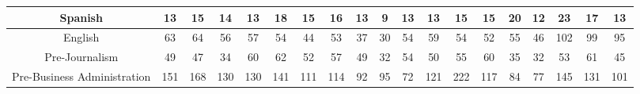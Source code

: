 \documentclass[10]{article}
\begin{document}
\begin{landscape}
\begin{longtable}[c]{|ccccccccccccccccccc|}
	\multicolumn{1}{|c|}{Spanish}                                    & \multicolumn{1}{c|}{13}         & \multicolumn{1}{c|}{15}         & \multicolumn{1}{c|}{14}         & \multicolumn{1}{c|}{13}         & \multicolumn{1}{c|}{18}         & \multicolumn{1}{c|}{15}         & \multicolumn{1}{c|}{16}         & \multicolumn{1}{c|}{13}         & \multicolumn{1}{c|}{9}          & \multicolumn{1}{c|}{13}         & \multicolumn{1}{c|}{13}         & \multicolumn{1}{c|}{15}         & \multicolumn{1}{c|}{15}         & \multicolumn{1}{c|}{20}         & \multicolumn{1}{c|}{12}         & \multicolumn{1}{c|}{23}         & \multicolumn{1}{c|}{17}         & 13         \\ \hline
	\multicolumn{1}{|c|}{English}                                    & \multicolumn{1}{c|}{63}         & \multicolumn{1}{c|}{64}         & \multicolumn{1}{c|}{56}         & \multicolumn{1}{c|}{57}         & \multicolumn{1}{c|}{54}         & \multicolumn{1}{c|}{44}         & \multicolumn{1}{c|}{53}         & \multicolumn{1}{c|}{37}         & \multicolumn{1}{c|}{30}         & \multicolumn{1}{c|}{54}         & \multicolumn{1}{c|}{59}         & \multicolumn{1}{c|}{54}         & \multicolumn{1}{c|}{52}         & \multicolumn{1}{c|}{55}         & \multicolumn{1}{c|}{46}         & \multicolumn{1}{c|}{102}        & \multicolumn{1}{c|}{99}         & 95         \\ \hline
	\multicolumn{1}{|c|}{Pre-Journalism}                             & \multicolumn{1}{c|}{49}         & \multicolumn{1}{c|}{47}         & \multicolumn{1}{c|}{34}         & \multicolumn{1}{c|}{60}         & \multicolumn{1}{c|}{62}         & \multicolumn{1}{c|}{52}         & \multicolumn{1}{c|}{57}         & \multicolumn{1}{c|}{49}         & \multicolumn{1}{c|}{32}         & \multicolumn{1}{c|}{54}         & \multicolumn{1}{c|}{50}         & \multicolumn{1}{c|}{55}         & \multicolumn{1}{c|}{60}         & \multicolumn{1}{c|}{35}         & \multicolumn{1}{c|}{32}         & \multicolumn{1}{c|}{53}         & \multicolumn{1}{c|}{61}         & 45         \\ \hline
	\multicolumn{1}{|c|}{Pre-Business Administration}                & \multicolumn{1}{c|}{151}        & \multicolumn{1}{c|}{168}        & \multicolumn{1}{c|}{130}        & \multicolumn{1}{c|}{130}        & \multicolumn{1}{c|}{141}        & \multicolumn{1}{c|}{111}        & \multicolumn{1}{c|}{114}        & \multicolumn{1}{c|}{92}         & \multicolumn{1}{c|}{95}         & \multicolumn{1}{c|}{72}         & \multicolumn{1}{c|}{121}        & \multicolumn{1}{c|}{222}        & \multicolumn{1}{c|}{117}        & \multicolumn{1}{c|}{84}         & \multicolumn{1}{c|}{77}         & \multicolumn{1}{c|}{145}        & \multicolumn{1}{c|}{131}        & 101        \\ \hline

\end{longtable}
\end{landscape}
\end{document}
